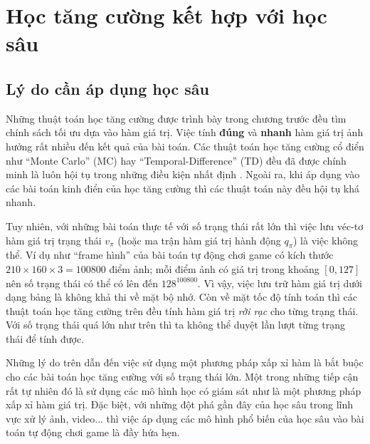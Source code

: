 \section{Học tăng cường kết hợp với học sâu}

\subsection{Lý do cần áp dụng học sâu}
	Những thuật toán học tăng cường được trình bày trong chương trước đều tìm chính sách tối ưu dựa vào hàm giá trị. 
	Việc tính \textbf{đúng} và \textbf{nhanh} hàm giá trị ảnh hưởng rất nhiều đến kết quả của bài toán. 
	Các thuật toán học tăng cường cổ điển như ``Monte Carlo'' (MC) hay ``Temporal-Difference'' (TD) đều đã được chính minh là luôn hội tụ trong những điều kiện nhất định \cite{sutton1998introduction}. 
	Ngoài ra, khi áp dụng vào các bài toán kinh điển của học tăng cường thì các thuật toán này đều hội tụ khá nhanh.
	
	Tuy nhiên, với những bài toán thực tế với số trạng thái rất lớn thì việc lưu véc-tơ hàm giá trị trạng thái $v_{\pi}$ (hoặc ma trận hàm giá trị hành động $q_{\pi}$) là việc không thể. 
	Ví dụ như ``frame hình'' của bài toán tự động chơi game có kích thước $210\times160\times3=100800$ điểm ảnh; mỗi điểm ảnh có giá trị trong khoảng $[0, 127]$ nên số trạng thái có thể có lên đến $128^{100800}$.
	Vì vậy, việc lưu trữ hàm giá trị dưới dạng bảng là không khả thi về mặt bộ nhớ.
	Còn về mặt tốc độ tính toán thì các thuật toán học tăng cường trên đều tính hàm giá trị \textit{rời rạc} cho từng trạng thái.
	Với số trạng thái quá lớn như trên thì ta không thể duyệt lần lượt từng trạng thái để tính được.
	
	Những lý do trên dẫn đến việc sử dụng một phương pháp xấp xỉ hàm là bắt buộc cho các bài toán học tăng cường với số trạng thái lớn.
	Một trong những tiếp cận rất tự nhiên đó là sử dụng các mô hình học có giám sát như là một phương pháp xấp xỉ hàm giá trị.
	Đặc biệt, với những đột phá gần đây của học sâu trong lĩnh vực xử lý ảnh, video... thì việc áp dụng các mô hình phổ biến của học sâu vào bài toán tự động chơi game là đầy hứa hẹn.
	
